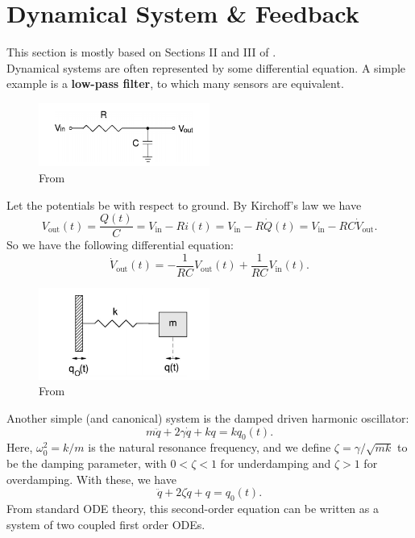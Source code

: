 \documentclass{book}
\theoremstyle{definition}
\newcommand{\f}[2]{\frac{#1}{#2}}
\begin{document}
\section*{Dynamical System \& Feedback}



This section is mostly based on Sections II and III of \cite{bechhoefer2005feedback}. \\


Dynamical systems are often represented by some differential equation. A simple example is a \textbf{low-pass filter}, to which many sensors are equivalent. 

\begin{figure}[!htb]
	\centering
	\includegraphics[width=0.5\textwidth]{images/low-pass-filter}
	\caption{From \cite{bechhoefer2005feedback}}
\end{figure}

Let the potentials be with respect to ground. By Kirchoff's law we have
\begin{equation*}
V_\text{out}(t) = \f{Q(t)}{C} = V_\text{in} - Ri(t) = V_\text{in} - R\dot{Q}(t) = V_\text{in} - RC\dot{V}_\text{out}.
\end{equation*}
So we have the following differential equation:
\begin{equation*}
\dot{V}_\text{out}(t) = -\f{1}{RC} V_\text{out}(t) + \f{1}{RC}V_\text{in}(t).
\end{equation*}


\begin{figure}[!htb]
	\centering
	\includegraphics[width=0.5\textwidth]{images/DDHO}
	\caption{From \cite{bechhoefer2005feedback}}
\end{figure}



Another simple (and canonical) system is the damped driven harmonic oscillator:
\begin{equation*}
m\ddot{q} + 2\gamma \dot{q} + kq = k q_0(t).
\end{equation*}
Here, $\omega_0^2 = k/m$ is the natural resonance frequency, and we define $\zeta = \gamma/ \sqrt{mk}$ to be the damping parameter, with $0 <\zeta <1 $ for underdamping and $\zeta > 1$ for overdamping. With these, we have
\begin{equation*}
\ddot{q} + 2\zeta \dot{q} + q = q_0(t). 
\end{equation*}
From standard ODE theory, this second-order equation can be written as a system of two coupled first order ODEs. 
\end{document}
